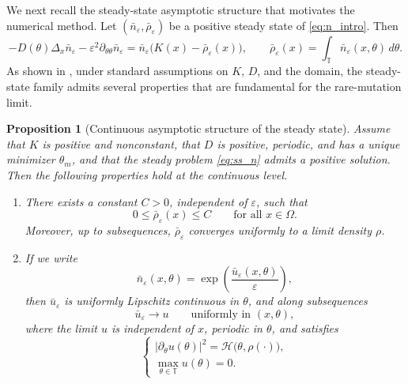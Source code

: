 \documentclass[11pt, dina4, amsfont12]{article}
\newtheorem{proposition}{Proposition}[section]
\begin{document}
We next recall the steady-state asymptotic structure that motivates the numerical method. Let \((\bar n_\varepsilon,\bar \rho_\varepsilon)\) be a positive steady state of \eqref{eq:n_intro}. Then
\begin{equation}\label{eq:ss_n}
-D(\theta)\Delta_x \bar n_\varepsilon
-\varepsilon^2\partial_{\theta\theta} \bar n_\varepsilon
=
\bar n_\varepsilon\bigl(K(x)-\bar\rho_\varepsilon(x)\bigr),
\qquad
\bar\rho_\varepsilon(x)=\int_{\mathbb T} \bar n_\varepsilon(x,\theta)\,d\theta.
\end{equation}
As shown in \cite{PerthameSouganidis}, under standard assumptions on \(K\), \(D\), and the domain, the steady-state family admits several properties that are fundamental for the rare-mutation limit.

\begin{proposition}[Continuous asymptotic structure of the steady state]\label{prop:continuous_structure}
Assume that \(K\) is positive and nonconstant, that \(D\) is positive, periodic, and has a unique minimizer \(\theta_m\), and that the steady problem \eqref{eq:ss_n} admits a positive solution. Then the following properties hold at the continuous level.
\begin{enumerate}
\item There exists a constant \(C>0\), independent of \(\varepsilon\), such that
\begin{equation}\label{eq:rho_continuous_bound}
0\le \bar\rho_\varepsilon(x)\le C
\qquad \text{for all } x\in\Omega.
\end{equation}
Moreover, up to subsequences, \(\bar\rho_\varepsilon\) converges uniformly to a limit density \(\rho\).

\item If we write
\begin{equation}\label{eq:u_log_transform}
\bar n_\varepsilon(x,\theta)=\exp\!\left(\frac{\bar u_\varepsilon(x,\theta)}{\varepsilon}\right),
\end{equation}
then \(\bar u_\varepsilon\) is uniformly Lipschitz continuous in \(\theta\), and along subsequences
\begin{equation}\label{eq:u_limit_uniform}
\bar u_\varepsilon \to u
\qquad \text{uniformly in } (x,\theta),
\end{equation}
where the limit \(u\) is independent of \(x\), periodic in \(\theta\), and satisfies
\begin{equation}\label{eq:HJ_limit}
\begin{cases}
|\partial_\theta u(\theta)|^2 = \mathcal H\bigl(\theta,\rho(\cdot)\bigr),\\[1mm]
\displaystyle \max_{\theta\in\mathbb T} u(\theta)=0.
\end{cases}
\end{equation}


\end{enumerate}
\end{proposition}
\end{document}
